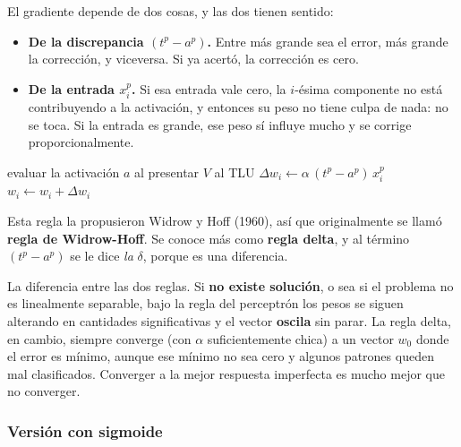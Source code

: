 \documentclass[11pt,letterpaper]{article}
\begin{document}
El gradiente depende de dos cosas, y las dos tienen sentido:

\begin{itemize}[itemsep=0.25em]
  \item \textbf{De la discrepancia $(t^p - a^p)$.} Entre más grande
        sea el error, más grande la corrección, y viceversa. Si ya
        acertó, la corrección es cero.
  \item \textbf{De la entrada $x_i^p$.} Si esa entrada vale cero, la
        $i$-ésima componente no está contribuyendo a la activación, y
        entonces su peso no tiene culpa de nada: no se toca. Si la
        entrada es grande, ese peso sí influye mucho y se corrige
        proporcionalmente.
\end{itemize}

\begin{algorithm}[H]
\caption{Entrenamiento con la regla delta}
\begin{algorithmic}[1]
\Repeat
    \State evaluar la activación $a$ al presentar $V$ al TLU
    \State $\Delta w_i \gets \alpha\,(t^p - a^p)\,x_i^p$
    \State $w_i \gets w_i + \Delta w_i$
  \EndFor
{}
\end{algorithmic}
\end{algorithm}

Esta regla la propusieron Widrow y Hoff (1960), así que originalmente
se llamó \textbf{regla de Widrow-Hoff}. Se conoce más como
\textbf{regla delta}, y al término $(t^p - a^p)$ se le dice
\emph{la} $\delta$, porque es una diferencia.

\begin{ojo}
  La diferencia entre las dos reglas. Si \textbf{no existe solución},
  o sea si el problema no es linealmente separable, bajo la regla del
  perceptrón los pesos se siguen alterando en cantidades
  significativas y el vector \textbf{oscila} sin parar. La regla
  delta, en cambio, siempre converge (con $\alpha$ suficientemente
  chica) a un vector $w_0$ donde el error es mínimo, aunque ese
  mínimo no sea cero y algunos patrones queden mal clasificados.
  Converger a la mejor respuesta imperfecta es mucho mejor que no
  converger.
\end{ojo}

\subsubsection*{Versión con sigmoide}
\end{document}
